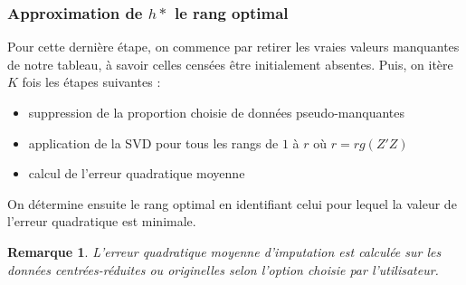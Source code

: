 \documentclass[12pt, openany, fleqn, french]{article}
\newtheorem*{remark}{Remarque}
\begin{document}
\subsubsection{Approximation de $h*$ le rang optimal}

    \vspace{0,5cm}
    Pour cette dernière étape, on commence par retirer les vraies valeurs manquantes de notre tableau, à savoir celles censées être initialement absentes. Puis, on itère $K$ fois les étapes suivantes :
    \begin{itemize}
        \item suppression de la proportion choisie de données pseudo-manquantes
        \item application de la SVD pour tous les rangs de $1$ à $r$ où $r = rg(Z'Z)$
        \item calcul de l'erreur quadratique moyenne
    \end{itemize}
    
    \hspace{2cm}
    
    On détermine ensuite le rang optimal en identifiant celui pour lequel la valeur de l'erreur quadratique est minimale.

    \begin{remark}
        L'erreur quadratique moyenne d'imputation est calculée sur les données centrées-réduites ou originelles selon l'option choisie par l'utilisateur.
    \end{remark}
    \vspace{0,5cm}
\end{document}

